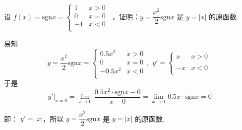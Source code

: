 \begin{problem}
	设 \(f(x) = \mathrm{sgn} x = \left\{ \begin{matrix}
1 & x > 0 \\
0 & x = 0 \\-1 & x < 0 \\
\end{matrix} \right.\ \) ，证明：\(y = \dfrac{x^{2}}{2}\mathrm{sgn}x\) 是
\(y = |x|\) 的原函数.

\begin{solution}
	易知
	$$y = \dfrac{x^{2}}{2}\mathrm{sgn}x = \left\{ \begin{matrix}
0.5x^{2} & x > 0 \\
0 & x = 0 \\-0.5x^{2} & x < 0 \\
\end{matrix} \right. ,\ \ y' = \left\{ \begin{matrix}
x & x > 0 \\
& \\-x & x < 0 \\
\end{matrix} \right.$$
于是
$$\left. \ y' \right|_{x = 0} = \lim_{x \rightarrow 0}\mspace{2mu}\frac{0.5x^{2} \cdot \mathrm{sgn}x - 0}{x - 0} = \lim_{x \rightarrow 0}\mspace{2mu} 0.5x \cdot \mathrm{sgn}x = 0$$

即： \(y' = |x|\)，所以 \(y = \dfrac{x^{2}}{2}\mathrm{sgn}x\) 是 \(y = |x|\)
的原函数.
\end{solution}
\end{problem}